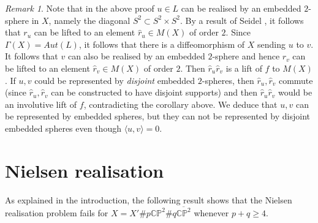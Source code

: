 \documentclass{amsart}
\theoremstyle{definition}
\theoremstyle{remark}
\newtheorem{remark}[theorem]{Remark}
\numberwithin{equation}{section}
\begin{document}
\begin{remark}
Note that in the above proof $u \in L$ can be realised by an embedded $2$-sphere in $X$, namely the diagonal $S^2 \subset S^2 \times S^2$. By a result of Seidel \cite{sei}, it follows that $r_u$ can be lifted to an element $\hat{r}_u \in M(X)$ of order $2$. Since $\Gamma(X) = Aut(L)$, it follows that there is a diffeomorphism of $X$ sending $u$ to $v$. It follows that $v$ can also be realised by an embedded $2$-sphere and hence $r_v$ can be lifted to an element $\hat{r}_v \in M(X)$ of order $2$. Then $\hat{r}_u \hat{r}_v$ is a lift of $f$ to $M(X)$. If $u,v$ could be represented by {\em disjoint} embedded $2$-spheres, then $\hat{r}_u, \hat{r}_v$ commute (since $\hat{r}_u, \hat{r}_v$ can be constructed to have disjoint supports) and then $\hat{r}_u \hat{r}_v$ would be an involutive lift of $f$, contradicting the corollary above. We deduce that $u,v$ can be represented by embedded spheres, but they can not be represented by disjoint embedded spheres even though $\langle u , v \rangle = 0$.
\end{remark}

\section{Nielsen realisation}\label{sec:nielsen}


As explained in the introduction, the following result shows that the Nielsen realisation problem fails for $X = X' \# p \mathbb{CP}^2 \# q \overline{\mathbb{CP}^2}$ whenever $p+q \ge 4$.
\end{document}
